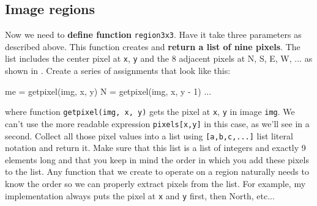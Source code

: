 \subsection{Image regions}

Now we need to {\bf define function} {\tt region3x3}.  Have it take three parameters as described above. This function creates and {\bf return a list of nine pixels}. The list includes the center pixel at {\tt x}, {\tt y} and the 8 adjacent pixels at N, S, E, W, ... as shown in . Create a series of assignments that look like this:

\begin{marginfigure}
\begin{center}
\end{center}
\label{region}
\end{marginfigure}

\begin{pyverbatim}
me = getpixel(img, x, y)
N = getpixel(img, x, y - 1)
...
\end{pyverbatim}

\noindent where function {\tt getpixel(img, x, y)} gets the pixel at {\tt x}, {\tt y} in image {\tt img}.  We can't use the more readable expression {\tt pixels[x,y]} in this case, as we'll see in a second. Collect all those pixel values into a list using {\tt [a,b,c,...]} list literal notation and return it. Make sure that this list is a list of integers and exactly 9 elements long and that you keep in mind the order in which you add these pixels to the list. Any function that we create to operate on a region naturally needs to know the order so we can properly extract pixels from the list. For example, my implementation always puts the pixel at {\tt x} and {\tt y} first, then North, etc...

